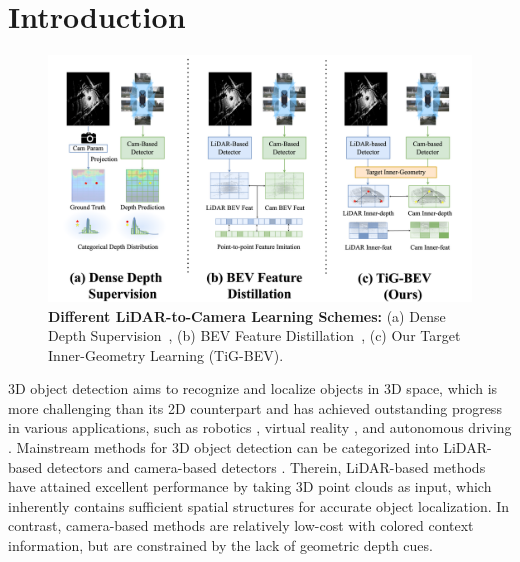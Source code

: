 
\vspace{-5mm}
\section{Introduction}
\label{sec:intro}


\begin{figure}[!t]
    \includegraphics[scale=0.062]{cvpr_2022/iccv_fig1.drawio.png}
    \caption{\textbf{Different LiDAR-to-Camera Learning Schemes:} (a) Dense Depth Supervision~\cite{b7,b51}, (b) BEV Feature Distillation~\cite{b9,b52}, (c) Our Target Inner-Geometry Learning (TiG-BEV).
    }
    \label{fig:teaser_figure}
\end{figure}

3D object detection aims to recognize and localize objects in 3D space, which is more challenging than its 2D counterpart and has achieved outstanding progress in various applications, such as robotics \cite{b1}, virtual reality \cite{b2}, and autonomous driving \cite{b3,b4,b5,b6}. Mainstream methods for 3D object detection can be categorized into LiDAR-based detectors \cite{b14, b3, b15} and camera-based detectors \cite{b7, b11, b12, b13, b47,b48}. Therein, LiDAR-based methods have attained excellent performance by taking 3D point clouds as input, which inherently contains sufficient spatial structures for accurate object localization. In contrast, camera-based methods are relatively low-cost with colored context information, but are constrained by the lack of geometric depth cues.

